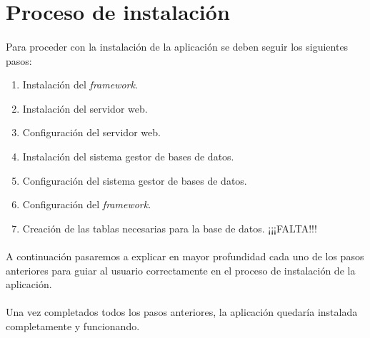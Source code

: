 \section{Proceso de instalación}\label{instalacion}

  \paragraph{}Para proceder con la instalación de la aplicación se deben seguir
  los siguientes pasos:

  \begin{enumerate}
   \item Instalación del \textit{framework}.
   \item Instalación del servidor web.
   \item Configuración del servidor web.
   \item Instalación del sistema gestor de bases de datos.
   \item Configuración del sistema gestor de bases de datos.
   \item Configuración del \textit{framework}.
   \item Creación de las tablas necesarias para la base de datos. ¡¡¡FALTA!!!
  \end{enumerate}

  \paragraph{}A continuación pasaremos a explicar en mayor profundidad cada
  uno de los pasos anteriores para guiar al usuario correctamente en el proceso
  de instalación de la aplicación.

  \begin{enumerate}
    
    
    
    
    
    
  \end{enumerate}

  \paragraph{}Una vez completados todos los pasos anteriores, la aplicación
  quedaría instalada completamente y funcionando.